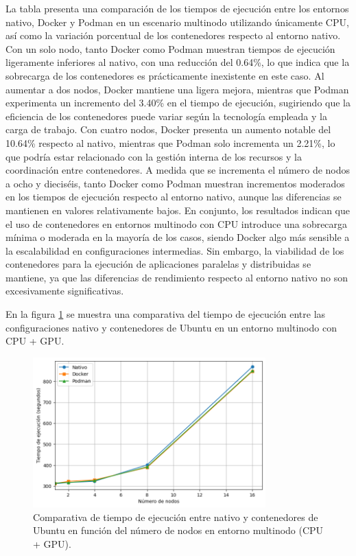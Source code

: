 La tabla presenta una comparación de los tiempos de ejecución entre los entornos nativo, Docker y Podman en un escenario multinodo utilizando únicamente CPU, así como la variación porcentual de los contenedores respecto al entorno nativo. Con un solo nodo, tanto Docker como Podman muestran tiempos de ejecución ligeramente inferiores al nativo, con una reducción del 0.64\%, lo que indica que la sobrecarga de los contenedores es prácticamente inexistente en este caso. Al aumentar a dos nodos, Docker mantiene una ligera mejora, mientras que Podman experimenta un incremento del 3.40\% en el tiempo de ejecución, sugiriendo que la eficiencia de los contenedores puede variar según la tecnología empleada y la carga de trabajo. Con cuatro nodos, Docker presenta un aumento notable del 10.64\% respecto al nativo, mientras que Podman solo incrementa un 2.21\%, lo que podría estar relacionado con la gestión interna de los recursos y la coordinación entre contenedores. A medida que se incrementa el número de nodos a ocho y dieciséis, tanto Docker como Podman muestran incrementos moderados en los tiempos de ejecución respecto al entorno nativo, aunque las diferencias se mantienen en valores relativamente bajos. En conjunto, los resultados indican que el uso de contenedores en entornos multinodo con CPU introduce una sobrecarga mínima o moderada en la mayoría de los casos, siendo Docker algo más sensible a la escalabilidad en configuraciones intermedias. Sin embargo, la viabilidad de los contenedores para la ejecución de aplicaciones paralelas y distribuidas se mantiene, ya que las diferencias de rendimiento respecto al entorno nativo no son excesivamente significativas.

En la figura \ref{fig:multi-node_ubuntu_container_vs_native_gpu_time} se muestra una comparativa del tiempo de ejecución entre las configuraciones nativo y contenedores de Ubuntu en un entorno multinodo con CPU + GPU.

\begin{figure}[H]
    \centering
    \includegraphics[width=0.8\textwidth]{imagenes/cap5/multi-node_ubuntu_container_vs_native_gpu_time.png}
    \caption{Comparativa de tiempo de ejecución entre nativo y contenedores de Ubuntu en función del número de nodos en entorno multinodo (CPU + GPU).}
    \label{fig:multi-node_ubuntu_container_vs_native_gpu_time}
\end{figure}

